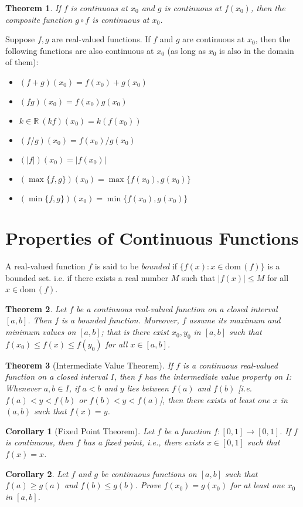 \documentclass[12pt, lettersize]{book}
\theoremstyle{plain}
\newtheorem{thm}{Theorem}[section]
\newtheorem{cor}{Corollary}[thm]
\theoremstyle{definition}
\theoremstyle{remark}
\newcommand{\R}{\mathbb{R}}
\newcommand{\dom}{\text{dom}\,}
\begin{document}
		\begin{thm}\label{def:17.5}
			If $f$ is continuous at $x_0$ and $g$ is continuous at $f(x_0)$, then the composite function $g\circ f$ is
			continuous at $x_0$.
		\end{thm}
		
		\begin{tcolorbox}[title=Conclusion]
			Suppose $f,g$ are real-valued functions. If $f$ and $g$ are continuous at $x_0$, then the following functions are also continuous at $x_0$ (as long as $x_0$ is also in the domain of them):
			\begin{itemize}
				\item $(f+g)(x_0)=f(x_0)+g(x_0)$
				\item $(fg)(x_0)=f(x_0)g(x_0)$
				\item $k\in\R\ (kf)(x_0)=k(f(x_0))$
				\item $(f/g)(x_0)=f(x_0)/g(x_0)$
				\item $(|f|)(x_0)=|f(x_0)|$
				\item $(\max\{f,g\})(x_0)=\max\{f(x_0),g(x_0)\}$
				\item $(\min\{f,g\})(x_0)=\min\{f(x_0),g(x_0)\}$
			\end{itemize}
		\end{tcolorbox}
		
		\newpage
		
		\section{Properties of Continuous Functions}
		A real-valued function $f$ is said to be \emph{bounded} if $\{f(x): x\in\dom(f)\}$ is a bounded set. i.e. if
		there exists a real number $M$ such that $|f(x)|\leq M$ for all $x\in\dom(f)$.
		
		\begin{thm}\label{def:18.1}
			Let $f$ be a continuous real-valued function on a \emph{closed} interval $[a,b]$. Then $f$ is a bounded function.
			Moreover, $f$ assume its maximum and minimum values on $[a,b]$; that is there exist $x_0,y_0$ in $[a,b]$
			such that $f(x_0)\leq f(x)\leq f(y_0)$ for all $x\in[a,b]$.
		\end{thm}
		
		\begin{thm}[Intermediate Value Theorem]\label{thm:18.2}
			If $f$ is a continuous real-valued function on a closed interval $I$, then $f$ has the intermediate value property on I: Whenever $a,b\in I$, if $a<b$ and $y$ lies between $f(a)$ and $f(b)$ [i.e. $f(a)<y<f(b)$ or $f(b)<y<f(a)$], then there exists at least one $x$ in
			$(a,b)$ such that $f(x)=y$.
		\end{thm}
		\begin{cor}[Fixed Point Theorem]
			Let $f$ be a function $f:[0,1]\rightarrow[0,1]$. If $f$ is continuous, then $f$ has a fixed point, i.e., there exists $x\in[0,1]$ such that $f(x)=x$.
		\end{cor}
		\begin{cor}
			Let $f$ and $g$ be continuous functions on $[a,b]$ such that $f(a)\geq g(a)$ and $f(b)\leq g(b)$. Prove $f(x_0)=g(x_0)$ for at least one $x_0$ in $[a,b]$.
		\end{cor}
		
\end{document}
